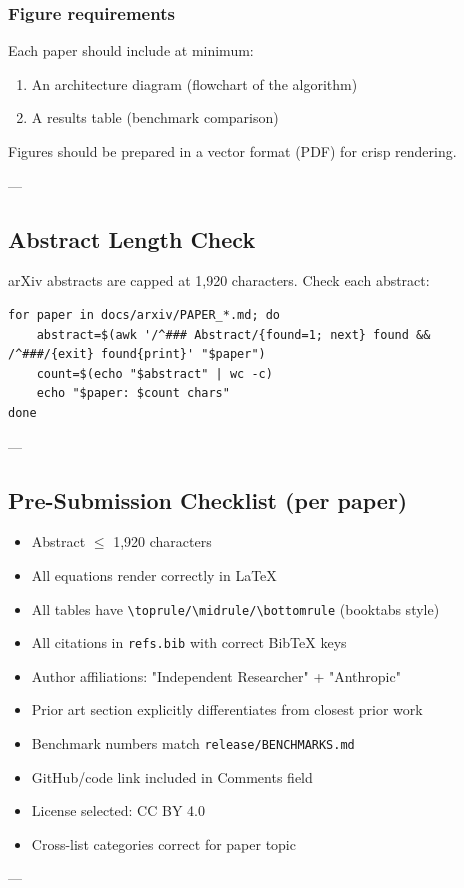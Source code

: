 \documentclass[10pt,journal,compsoc]{IEEEtran}
\begin{document}
\subsubsection{Figure requi\-rements}
Each paper should include at minimum:
\begin{enumerate}
\item An archi\-tecture diagram (flowchart of the algorithm)
\item A results table (benchmark comparison)

\end{enumerate}
Figures should be prepared in a vector format (PDF) for crisp rendering.

---

\subsection{Abstract Length Check}

arXiv abstracts are capped at 1,920 characters. Check each abstract:

\begin{lstlisting}
for paper in docs/arxiv/PAPER_*.md; do
    abstract=$(awk '/^### Abstract/{found=1; next} found && /^###/{exit} found{print}' "$paper")
    count=$(echo "$abstract" | wc -c)
    echo "$paper: $count chars"
done
\end{lstlisting}

---

\subsection{Pre-Submission Checklist (per paper)}

\begin{itemize}
\item [ ] Abstract $\le$ 1,920 characters
\item [ ] All equations render correctly in LaTeX
\item [ ] All tables have \texttt{\textbackslash toprule/\textbackslash midrule/\textbackslash bottomrule} (booktabs style)
\item [ ] All citations in \texttt{refs.bib} with correct BibTeX keys
\item [ ] Author affil\-iations: "Independent Researcher" + "Anthropic"
\item [ ] Prior art section explicitly diffe\-rentiates from closest prior work
\item [ ] Benchmark numbers match \texttt{release/BENCHMARKS.md}
\item [ ] GitHub/code link included in Comments field
\item [ ] License selected: CC BY 4.0
\item [ ] Cross-list categories correct for paper topic

\end{itemize}
---
\end{document}
